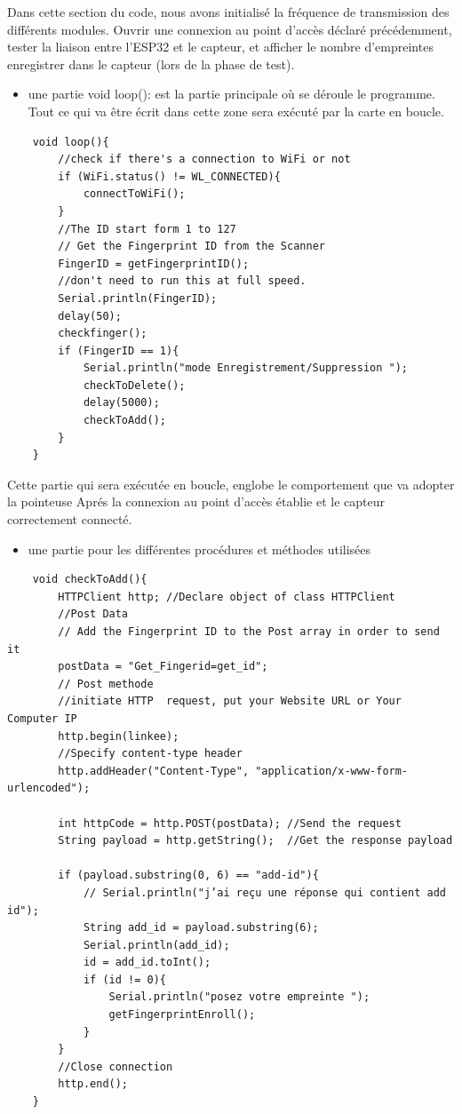 Dans cette section du code, nous avons initialisé la fréquence de transmission
des différents modules. Ouvrir une connexion au point d’accès déclaré
précédemment, tester la liaison entre l’ESP32 et le capteur, et afficher le
nombre d’empreintes enregistrer dans le capteur (lors de la phase de test).      

\begin{itemize}
    \item [\textbullet] une partie void loop(): est la partie principale où se
        déroule le programme. Tout ce qui va être écrit dans cette zone sera
        exécuté par la carte en boucle. 
\end{itemize}

\begin{verbatim}
    void loop(){
        //check if there's a connection to WiFi or not
        if (WiFi.status() != WL_CONNECTED){
            connectToWiFi();
        }
        //The ID start form 1 to 127
        // Get the Fingerprint ID from the Scanner
        FingerID = getFingerprintID(); 
        //don't need to run this at full speed.
        Serial.println(FingerID);
        delay(50);
        checkfinger();
        if (FingerID == 1){
            Serial.println("mode Enregistrement/Suppression ");
            checkToDelete();
            delay(5000);
            checkToAdd();
        }
    }
\end{verbatim}

Cette partie qui sera exécutée en boucle, englobe le comportement que va adopter
la pointeuse Aprés la connexion au point d’accès établie
et le capteur correctement connecté.

\begin{itemize}
    \item[\textbullet] une partie pour les différentes procédures et méthodes
        utilisées
\end{itemize}

\begin{verbatim}
    void checkToAdd(){
        HTTPClient http; //Declare object of class HTTPClient
        //Post Data
        // Add the Fingerprint ID to the Post array in order to send it 
        postData = "Get_Fingerid=get_id"; 
        // Post methode
        //initiate HTTP  request, put your Website URL or Your Computer IP
        http.begin(linkee);                                              
        //Specify content-type header
        http.addHeader("Content-Type", "application/x-www-form-urlencoded"); 

        int httpCode = http.POST(postData); //Send the request
        String payload = http.getString();  //Get the response payload

        if (payload.substring(0, 6) == "add-id"){
            // Serial.println("j’ai reçu une réponse qui contient add id");
            String add_id = payload.substring(6);
            Serial.println(add_id);
            id = add_id.toInt();
            if (id != 0){
                Serial.println("posez votre empreinte ");
                getFingerprintEnroll();
            }
        }
        //Close connection
        http.end(); 
    }
\end{verbatim}

